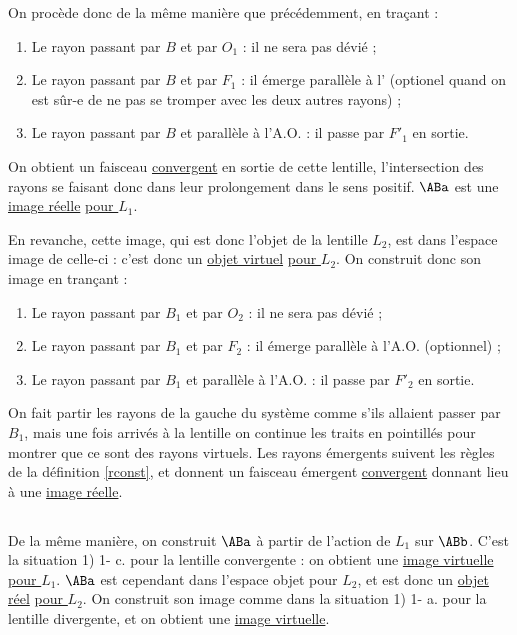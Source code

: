 \documentclass[10pt,a5paper,notitlepage]{book}
\begin{document}
On procède donc de la même manière que précédemment, en traçant :
\begin{enumerate}
    \item Le rayon passant par $B$ et par $O_1$ : il ne sera pas dévié ;
    \item Le rayon passant par $B$ et par $F_1$ : il émerge parallèle à
        l' (optionel quand on est sûr-e de ne pas se
        tromper avec les deux autres rayons) ;
    \item Le rayon passant par $B$ et parallèle à l'A.O. : il passe par $F'_1$
        en sortie.
\end{enumerate}

On obtient un faisceau \underline{convergent} en sortie de cette lentille,
l'intersection des rayons se faisant donc dans leur prolongement dans le sens
positif. $\ABa$ est une \underline{image réelle} \underline{\underline{pour
$L_1$}}. \bigbreak

En revanche, cette image, qui est donc l'objet de la lentille $L_2$, est dans
l'espace image de celle-ci : c'est donc un \underline{objet virtuel}
\underline{\underline{pour $L_2$}}. On construit donc son image en trançant :

\begin{enumerate}
    \item Le rayon passant par $B_1$ et par $O_2$ : il ne sera pas dévié ;
    \item Le rayon passant par $B_1$ et par $F_2$ : il émerge parallèle à l'A.O.
        (optionnel) ;
    \item Le rayon passant par $B_1$ et parallèle à l'A.O. : il passe par $F'_2$
        en sortie.
\end{enumerate}

On fait partir les rayons de la gauche du système comme s'ils allaient passer
par $B_1$, mais une fois arrivés à la lentille on continue les traits en
pointillés pour montrer que ce sont des rayons virtuels. Les rayons émergents
suivent les règles de la définition \ref{rconst}, et donnent un faisceau
émergent \underline{convergent} donnant lieu à une \underline{image réelle}.

\subsection{}
De la même manière, on construit $\ABa$ à partir de l'action de $L_1$ sur
$\ABb$.  C'est la situation 1) 1- c. pour la lentille convergente : on obtient
une \underline{image virtuelle} \underline{\underline{pour $L_1$}}. $\ABa$ est
cependant dans l'espace objet pour $L_2$, et est donc un \underline{objet réel}
\underline{\underline{pour $L_2$}}. On construit son image comme dans la
situation 1) 1- a. pour la lentille divergente, et on obtient une
\underline{image virtuelle}.
\end{document}
